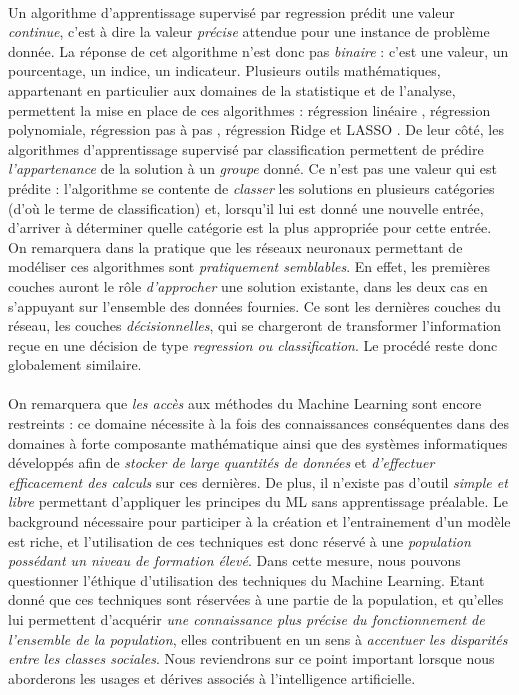 \paragraph{} Un algorithme d'apprentissage supervisé par regression prédit une valeur \emph{continue}, c'est à dire la valeur \emph{précise} attendue pour une instance de problème donnée.
La réponse de cet algorithme n'est donc pas \emph{binaire} : c'est une valeur, un pourcentage, un indice, un indicateur. Plusieurs outils mathématiques, appartenant en particulier aux
domaines de la statistique et de l'analyse, permettent la mise en place de ces algorithmes \cite{Internet3} : régression linéaire \cite{Internet6}, régression polynomiale, régression pas à pas 
\cite{University1}, régression Ridge et LASSO \cite{University0}. De leur côté, les algorithmes d'apprentissage supervisé par classification permettent de prédire \emph{l'appartenance} de la
solution à un \emph{groupe} donné. Ce n'est pas une valeur qui est prédite : l'algorithme se contente de \emph{classer} les solutions en plusieurs catégories (d'où le terme de classification)
et, lorsqu'il lui est donné une nouvelle entrée, d'arriver à déterminer quelle catégorie est la plus appropriée pour cette entrée. On remarquera dans la pratique que les réseaux neuronaux
permettant de modéliser ces algorithmes sont \emph{pratiquement semblables}. En effet, les premières couches auront le rôle \emph{d'approcher} une solution existante, dans les deux cas en
s'appuyant sur l'ensemble des données fournies. Ce sont les dernières couches du réseau, les couches \emph{décisionnelles}, qui se chargeront de transformer l'information reçue en une décision
de type \emph{regression ou classification}. Le procédé reste donc globalement similaire.

\paragraph{} On remarquera que \emph{les accès} aux méthodes du Machine Learning sont encore restreints : ce domaine nécessite à la fois des connaissances conséquentes dans des domaines 
à forte composante mathématique ainsi que des systèmes informatiques développés afin de \emph{stocker de large quantités de données} et \emph{d'effectuer efficacement des calculs} sur ces
dernières. De plus, il n'existe pas d'outil \emph{simple et libre} permettant d'appliquer les principes du ML sans apprentissage préalable. Le background nécessaire pour participer à la création 
et l'entrainement d'un modèle est riche, et l'utilisation de ces techniques est donc réservé à une \emph{population possédant un niveau de formation élevé}. Dans cette mesure, nous pouvons
questionner l'éthique d'utilisation des techniques du Machine Learning. Etant donné que ces techniques sont réservées à une partie de la population, et qu'elles lui permettent d'acquérir 
\emph{une connaissance plus précise du fonctionnement de l'ensemble de la population}, elles contribuent en un sens à \emph{accentuer les disparités entre les classes sociales}. Nous reviendrons
sur ce point important lorsque nous aborderons les usages et dérives associés à l'intelligence artificielle.

